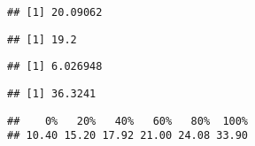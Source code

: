 \documentclass[
  a4paper,
]{article}
\newenvironment{Shaded}{\begin{snugshade}}{\end{snugshade}}
\newcommand{\DecValTok}[1]{\textcolor[rgb]{0.00,0.00,0.81}{#1}}
\newcommand{\FloatTok}[1]{\textcolor[rgb]{0.00,0.00,0.81}{#1}}
\newcommand{\FunctionTok}[1]{\textcolor[rgb]{0.13,0.29,0.53}{\textbf{#1}}}
\newcommand{\NormalTok}[1]{#1}
\newcommand{\SpecialCharTok}[1]{\textcolor[rgb]{0.81,0.36,0.00}{\textbf{#1}}}
\begin{document}
\begin{verbatim}
## [1] 20.09062
\end{verbatim}

\begin{Shaded}
\end{Shaded}

\begin{verbatim}
## [1] 19.2
\end{verbatim}

\begin{Shaded}
\end{Shaded}

\begin{verbatim}
## [1] 6.026948
\end{verbatim}

\begin{Shaded}
\end{Shaded}

\begin{verbatim}
## [1] 36.3241
\end{verbatim}

\begin{Shaded}
\end{Shaded}

\begin{verbatim}
##    0%   20%   40%   60%   80%  100% 
## 10.40 15.20 17.92 21.00 24.08 33.90
\end{verbatim}

\begin{Shaded}
\end{Shaded}
\end{document}
